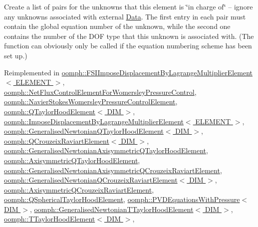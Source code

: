 Create a list of pairs for the unknowns that this element is \char`\"{}in charge of\char`\"{} -- ignore any unknowns associated with external {\ttfamily \hyperlink{classoomph_1_1Data}{Data}}. The first entry in each pair must contain the global equation number of the unknown, while the second one contains the number of the D\+OF type that this unknown is associated with. (The function can obviously only be called if the equation numbering scheme has been set up.) 



Reimplemented in \hyperlink{classoomph_1_1FSIImposeDisplacementByLagrangeMultiplierElement_a7134be65db436042a327e7e9d49fb507}{oomph\+::\+F\+S\+I\+Impose\+Displacement\+By\+Lagrange\+Multiplier\+Element$<$ E\+L\+E\+M\+E\+N\+T $>$}, \hyperlink{classoomph_1_1NetFluxControlElementForWomersleyPressureControl_a63f6761cad384044fae2c8339422c9df}{oomph\+::\+Net\+Flux\+Control\+Element\+For\+Womersley\+Pressure\+Control}, \hyperlink{classoomph_1_1NavierStokesWomersleyPressureControlElement_ac06944c7b24e71a1d9341166049fc360}{oomph\+::\+Navier\+Stokes\+Womersley\+Pressure\+Control\+Element}, \hyperlink{classoomph_1_1QTaylorHoodElement_abe161055c22b04059a4a4e71cd2681f0}{oomph\+::\+Q\+Taylor\+Hood\+Element$<$ D\+I\+M $>$}, \hyperlink{classoomph_1_1ImposeDisplacementByLagrangeMultiplierElement_aa6fc1525ac4a93f5135a0c58bd211ffb}{oomph\+::\+Impose\+Displacement\+By\+Lagrange\+Multiplier\+Element$<$ E\+L\+E\+M\+E\+N\+T $>$}, \hyperlink{classoomph_1_1GeneralisedNewtonianQTaylorHoodElement_ab88a4e14c48864239def0f2ae164528e}{oomph\+::\+Generalised\+Newtonian\+Q\+Taylor\+Hood\+Element$<$ D\+I\+M $>$}, \hyperlink{classoomph_1_1QCrouzeixRaviartElement_a2c4a2475b10e711163c3e63835acf9a8}{oomph\+::\+Q\+Crouzeix\+Raviart\+Element$<$ D\+I\+M $>$}, \hyperlink{classoomph_1_1GeneralisedNewtonianAxisymmetricQTaylorHoodElement_a88d4fad547ca6ad754563bc7f1ecf34f}{oomph\+::\+Generalised\+Newtonian\+Axisymmetric\+Q\+Taylor\+Hood\+Element}, \hyperlink{classoomph_1_1AxisymmetricQTaylorHoodElement_ad763c91177814d4221ec485b076a38e9}{oomph\+::\+Axisymmetric\+Q\+Taylor\+Hood\+Element}, \hyperlink{classoomph_1_1GeneralisedNewtonianAxisymmetricQCrouzeixRaviartElement_a986a8326bbeda5ad9dd1f69c5d2b9e07}{oomph\+::\+Generalised\+Newtonian\+Axisymmetric\+Q\+Crouzeix\+Raviart\+Element}, \hyperlink{classoomph_1_1GeneralisedNewtonianQCrouzeixRaviartElement_a149673f13602b36ed16a660950d6355f}{oomph\+::\+Generalised\+Newtonian\+Q\+Crouzeix\+Raviart\+Element$<$ D\+I\+M $>$}, \hyperlink{classoomph_1_1AxisymmetricQCrouzeixRaviartElement_a83a50021a007f1a932fe841119d93412}{oomph\+::\+Axisymmetric\+Q\+Crouzeix\+Raviart\+Element}, \hyperlink{classoomph_1_1QSphericalTaylorHoodElement_a62c62fd109c074654a239bcfb99522c6}{oomph\+::\+Q\+Spherical\+Taylor\+Hood\+Element}, \hyperlink{classoomph_1_1PVDEquationsWithPressure_a46331a93e6ac8cff7b4badad1c7a7a03}{oomph\+::\+P\+V\+D\+Equations\+With\+Pressure$<$ D\+I\+M $>$}, \hyperlink{classoomph_1_1GeneralisedNewtonianTTaylorHoodElement_aae85d62a6cf20353fa93b75dc8f5182b}{oomph\+::\+Generalised\+Newtonian\+T\+Taylor\+Hood\+Element$<$ D\+I\+M $>$}, \hyperlink{classoomph_1_1TTaylorHoodElement_ab575a23e0341900bcd8b02732319a45d}{oomph\+::\+T\+Taylor\+Hood\+Element$<$ D\+I\+M $>$}, 